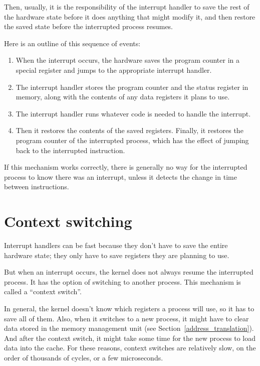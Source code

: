 \documentclass[12pt]{book}
\begin{document}
{Then, usually, it is the responsibility of the interrupt handler
to save the rest of the hardware state before it does anything that
might modify it, and then restore the saved state before the interrupted
process resumes.

Here is an outline of this sequence of events:

\begin{enumerate}

\item When the interrupt occurs, the hardware saves the program
counter in a special register and jumps to the appropriate interrupt
handler.

\item The interrupt handler stores the program counter and the
status register in memory, along with the contents of any data
registers it plans to use.

\item The interrupt handler runs whatever code is needed to handle
the interrupt.

\item Then it restores the contents of the saved registers.  Finally,
it restores the program counter of the interrupted process, which
has the effect of jumping back to the interrupted instruction.

\end{enumerate}

If this mechanism works correctly, there is generally no way for
the interrupted process to know there was an interrupt, unless
it detects the change in time between instructions.


\section{Context switching}

Interrupt handlers can be fast because they don't have to save the
entire hardware state; they only have to save registers they are
planning to use.

But when an interrupt occurs, the kernel does not always resume the
interrupted process.  It has the option of switching to another
process.  This mechanism is called a ``context switch''.

In general, the kernel doesn't know which registers a process will
use, so it has to save all of them.  Also, when it switches to a new
process, it might have to clear data stored in the memory management
unit (see
Section~\ref{address_translation}).  And after the context switch, it
might take some time for the new process to load data into the cache.
For these reasons, context switches are relatively slow, on the order
of thousands of cycles, or a few microseconds.

}
\end{document}
